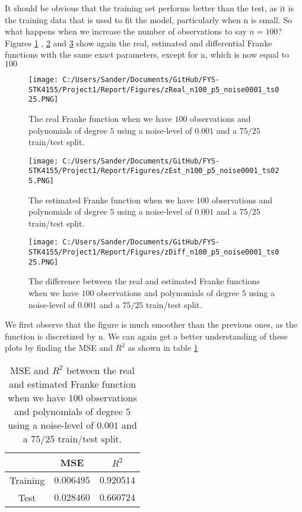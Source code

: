 \documentclass[12pt,a4paper]{article}
\begin{document}
\noindent It should be obvious that the training set performs better than the test, as it is the training data that is used to fit the model, particularly when n is small. So what happens when we increase the number of observations to say $n = 100$? Figures \ref{fig:FrankeReal2} , \ref{fig:FrankeEst2} and \ref{fig:FrankeDIFF2} show again the real, estimated and differential Franke functions with the same exact parameters, except for n, which is now equal to $100$

\begin{figure}[H]
\centering
\texttt{[image: C:/Users/Sander/Documents/GitHub/FYS-STK4155/Project1/Report/Figures/zReal\_n100\_p5\_noise0001\_ts025.PNG]}
\caption{\label{fig:FrankeReal2} The real Franke function when we have $100$ observations and polynomials of degree $5$ using a noise-level of $0.001$ and a $75/25$ train/test split.}
\end{figure}

\begin{figure}[H]
\centering
\texttt{[image: C:/Users/Sander/Documents/GitHub/FYS-STK4155/Project1/Report/Figures/zEst\_n100\_p5\_noise0001\_ts025.PNG]}
\caption{\label{fig:FrankeEst2} The estimated Franke function when we have $100$ observations and polynomials of degree $5$ using a noise-level of $0.001$ and a $75/25$ train/test split.}
\end{figure}

\begin{figure}[H]
\centering
\texttt{[image: C:/Users/Sander/Documents/GitHub/FYS-STK4155/Project1/Report/Figures/zDiff\_n100\_p5\_noise0001\_ts025.PNG]}
\caption{\label{fig:FrankeDIFF2} The difference between the real and estimated Franke functions when we have $100$ observations and polynomials of degree $5$ using a noise-level of $0.001$ and a $75/25$ train/test split.}
\end{figure}

\noindent We first observe that the figure is much smoother than the previous ones, as the function is discretized by n. We can again get a better understanding of these plots by finding the MSE and $R^2$ as shown in table \ref{tab:ESTREAL2}

\begin{table}[h]
\caption{\label{tab:ESTREAL2} MSE and $R^2$ between the real and estimated Franke function when we have $100$ observations and polynomials of degree $5$ using a noise-level of $0.001$ and a $75/25$ train/test split.}
\centering
\begin{tabular}{c|c|c}
 & MSE & $R^2$\\
\hline
Training & $0.006495$ & $0.920514$\\
\hline
Test & $0.028460$ & $0.660724$\\	  
\end{tabular}
\end{table}
\end{document}
